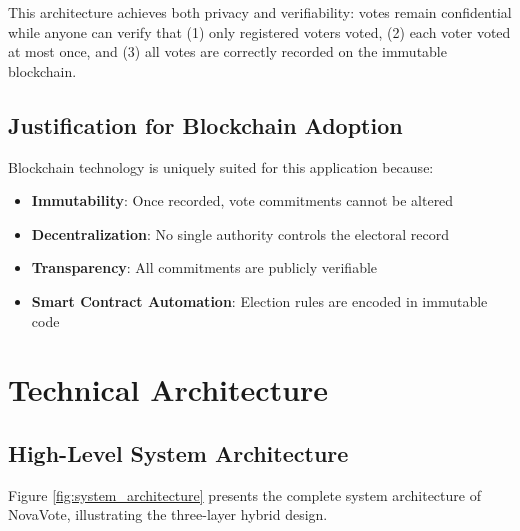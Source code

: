 \documentclass[conference]{IEEEtran}
\begin{document}
This architecture achieves both privacy and verifiability: votes remain confidential while anyone can verify that (1) only registered voters voted, (2) each voter voted at most once, and (3) all votes are correctly recorded on the immutable blockchain.

\subsection{Justification for Blockchain Adoption}
Blockchain technology is uniquely suited for this application because:
\begin{itemize}
    \item \textbf{Immutability}: Once recorded, vote commitments cannot be altered
    \item \textbf{Decentralization}: No single authority controls the electoral record
    \item \textbf{Transparency}: All commitments are publicly verifiable
    \item \textbf{Smart Contract Automation}: Election rules are encoded in immutable code
\end{itemize}

\section{Technical Architecture}

\subsection{High-Level System Architecture}

Figure \ref{fig:system_architecture} presents the complete system architecture of NovaVote, illustrating the three-layer hybrid design.
\end{document}
